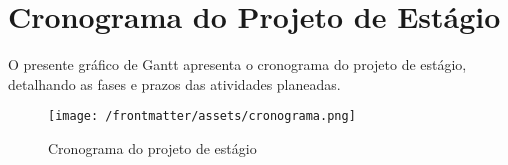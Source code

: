 
\chapter{Cronograma do Projeto de Estágio}

O presente gráfico de Gantt apresenta o cronograma do projeto de estágio, detalhando as fases e prazos das atividades planeadas.

\begin{figure}[h]
    \centering
    \texttt{[image: /frontmatter/assets/cronograma.png]}
    \caption{Cronograma do projeto de estágio}
    \label{fig:cronograma}
\end{figure}


\label{AppendixA}

